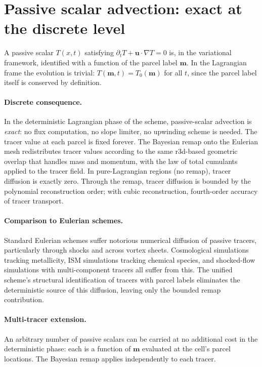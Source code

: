 \documentclass[11pt]{article}
\newcommand{\bu}{\bm{u}}
\newcommand{\bmlab}{\bm{m}}
\begin{document}
\section{Passive scalar advection: exact at the discrete level}
\label{sec:tracer}

A passive scalar $T(x,t)$ satisfying $\partial_t T + \bu\cdot\nabla T
= 0$ is, in the variational framework, identified with a function of
the parcel label $\bmlab$. In the Lagrangian frame the evolution is
trivial: $T(\bmlab,t) = T_0(\bmlab)$ for all $t$, since the parcel label
itself is conserved by definition.

\paragraph{Discrete consequence.} In the deterministic Lagrangian
phase of the scheme, passive-scalar advection is \emph{exact}: no
flux computation, no slope limiter, no upwinding scheme is needed.
The tracer value at each parcel is fixed forever. The Bayesian remap
onto the Eulerian mesh redistributes tracer values according to the
same r3d-based geometric overlap that handles mass and momentum,
with the law of total cumulants applied to the tracer field. In
pure-Lagrangian regions (no remap), tracer diffusion is exactly
zero. Through the remap, tracer diffusion is bounded by the
polynomial reconstruction order; with cubic reconstruction,
fourth-order accuracy of tracer transport.

\paragraph{Comparison to Eulerian schemes.} Standard Eulerian schemes
suffer notorious numerical diffusion of passive tracers, particularly
through shocks and across vortex sheets. Cosmological simulations
tracking metallicity, ISM simulations tracking chemical species,
and shocked-flow simulations with multi-component tracers all suffer
from this. The unified scheme's structural identification of tracers
with parcel labels eliminates the deterministic source of this
diffusion, leaving only the bounded remap contribution.

\paragraph{Multi-tracer extension.} An arbitrary number of passive
scalars can be carried at no additional cost in the deterministic
phase: each is a function of $\bmlab$ evaluated at the cell's parcel
locations. The Bayesian remap applies independently to each tracer.
\end{document}
